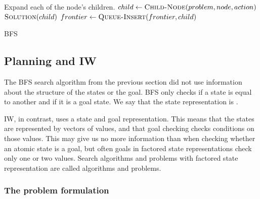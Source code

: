 \begin{algorithm}[hbtp]
\begin{algorithmic}
        \State \Comment Expand each of the node's children.
        \State $child \gets \Call{Child-Node}{problem, node, action}$
            \State \Return $\Call{Solution}{child}$
          \EndIf
          \State $frontier \gets \Call{Queue-Insert}{frontier, child}$
        \EndIf
      \EndFor
    \EndLoop
  \EndFunction
\end{algorithmic}
\caption{\acl{BFS} \citep[Sections~3.3,~3.4]{russell2009aima}}
\label{alg:bfs}
\end{algorithm}

\subsection{Planning and \acl{IW}\label{subsec:iterated-width}}
The \ac{BFS} search algorithm from the previous section did not use information
about the structure of the states or the goal. \ac{BFS} only checks if a state
is equal to another and if it is a goal state. We say that the state
representation is .

\acf{IW}, in contrast, uses a  state and goal
representation. This means that the states are represented by vectors of values,
and that goal checking checks conditions on those values. This may give us no
more information than when checking whether an atomic state is a goal, but often
goals in factored state representations check only one or two values. Search
algorithms and problems with factored state representation are called
 algorithms and problems.
\citep[Sections~2.4.7,~3.0]{russell2009aima}

\subsubsection{The problem formulation}

